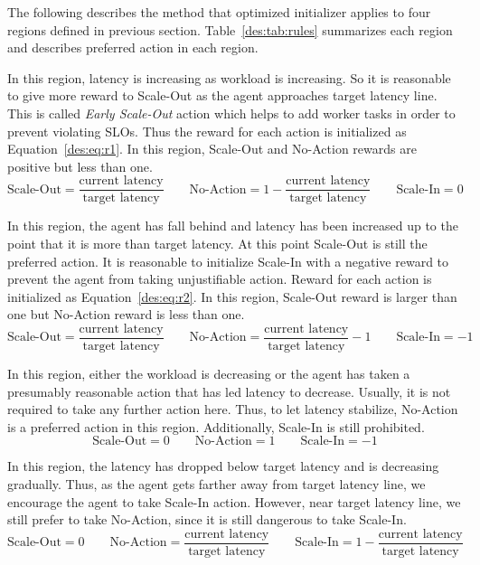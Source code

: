 The following describes the method that optimized initializer applies to four regions defined in previous section. Table~\ref{des:tab:rules} summarizes each region and describes preferred action in each region.
\begin{description}[leftmargin=0pt,nolistsep]
    \item[Region 1] In this region, latency is increasing as workload is increasing. So it is reasonable to give more reward to Scale-Out as the agent approaches target latency line. This is called \emph{Early Scale-Out} action which helps to add worker tasks in order to prevent violating SLOs. Thus the reward for each action is initialized as Equation~\ref{des:eq:r1}. In this region, Scale-Out and No-Action rewards are positive but less than one.
    \begin{equation}
    \text{Scale-Out}=\frac{\text{current latency}}{\text{target latency}} \qquad \text{No-Action}=1-\frac{\text{current latency}}{\text{target latency}} \qquad \text{Scale-In}=0
    \label{des:eq:r1}
    \end{equation}
    \item[Region 2] In this region, the agent has fall behind and latency has been increased up to the point that it is more than target latency. At this point Scale-Out is still the preferred action. It is reasonable to initialize Scale-In with a negative reward to prevent the agent from taking unjustifiable action.
    Reward for each action is initialized as Equation~\ref{des:eq:r2}. In this region, Scale-Out reward is larger than one but No-Action reward is less than one.
    \begin{equation}
    \text{Scale-Out}=\frac{\text{current latency}}{\text{target latency}} \qquad \text{No-Action}=\frac{\text{current latency}}{\text{target latency}}-1 \qquad \text{Scale-In}=-1
    \label{des:eq:r2}
    \end{equation}
    \item[Region 3] In this region, either the workload is decreasing or the agent has taken a presumably reasonable action that has led latency to decrease. Usually, it is not required to take any further action here. Thus, to let latency stabilize, No-Action is a preferred action in this region. Additionally, Scale-In is still prohibited.
    \begin{equation}
    \text{Scale-Out}=0 \qquad \text{No-Action}=1 \qquad \text{Scale-In}=-1
    \label{des:eq:r3}
    \end{equation}
    \item[Region 4] In this region, the latency has dropped below target latency and is decreasing gradually. Thus, as the agent gets farther away from target latency line, we encourage the agent to take Scale-In action. However, near target latency line, we still prefer to take No-Action, since it is still dangerous to take Scale-In.
    \begin{equation}
    \text{Scale-Out}=0 \qquad \text{No-Action}=\frac{\text{current latency}}{\text{target latency}} \qquad \text{Scale-In}=1-\frac{\text{current latency}}{\text{target latency}}
    \label{des:eq:r4}
    \end{equation}
\end{description}

